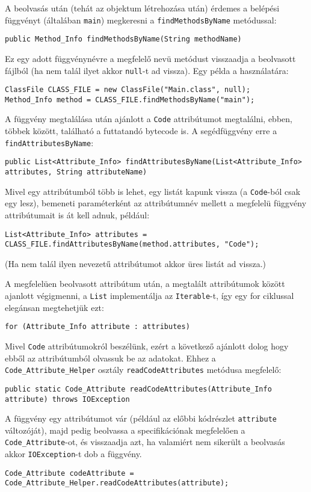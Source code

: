A beolvasás után (tehát az objektum létrehozása után) érdemes a belépési függvényt (általában \lstinline{main}) megkeresni a \lstinline{findMethodsByName} metódussal:
\begin{verbatim}
public Method_Info findMethodsByName(String methodName)
\end{verbatim}
Ez egy adott függvénynévre a megfelelő nevü metódust visszaadja a beolvasott fájlból (ha nem talál ilyet akkor \lstinline{null}-t ad vissza).
Egy példa a használatára:
\begin{verbatim}
ClassFile CLASS_FILE = new ClassFile("Main.class", null);
Method_Info method = CLASS_FILE.findMethodsByName("main");
\end{verbatim}

A függvény megtalálása után ajánlott a \lstinline{Code} attribútumot megtalálni, ebben, többek között, található a futtatandó bytecode is. A segédfüggvény erre a \lstinline{findAttributesByName}:
\begin{verbatim}
public List<Attribute_Info> findAttributesByName(List<Attribute_Info> attributes, String attributeName)
\end{verbatim}
Mivel egy attribútumból több is lehet, egy listát kapunk vissza (a \lstinline{Code}-ból csak egy lesz), bemeneti paraméterként az attribútumnév mellett a megfelelü függvény attribútumait is át kell adnuk, például:
\begin{verbatim}
List<Attribute_Info> attributes = CLASS_FILE.findAttributesByName(method.attributes, "Code");
\end{verbatim}
(Ha nem talál ilyen nevezetű attribútumot akkor üres listát ad vissza.)

A megfelelüen beolvasott attribútum után, a megtalált attribútumok között ajanlott végigmenni, a \lstinline{List} implementálja az \lstinline{Iterable}-t, így egy for ciklussal elegánsan megtehetjük ezt:
\begin{verbatim}
for (Attribute_Info attribute : attributes)
\end{verbatim}

Mivel \lstinline{Code} attribútumokról beszélünk, ezért a következő ajánlott dolog hogy ebből az attribútumból olvassuk be az adatokat. Ehhez a \lstinline{Code_Attribute_Helper} osztály \lstinline{readCodeAttributes} metódusa megfelelő:
\begin{verbatim}
public static Code_Attribute readCodeAttributes(Attribute_Info attribute) throws IOException
\end{verbatim}
A függvény egy attribútumot vár (például az előbbi kódrészlet \lstinline{attribute} változóját), majd pedig beolvassa a specifikációnak megfelelően a \lstinline{Code_Attribute}-ot, és visszaadja azt, ha valamiért nem sikerült a beolvasás akkor \lstinline{IOException}-t dob a függvény.
\begin{verbatim}
Code_Attribute codeAttribute = Code_Attribute_Helper.readCodeAttributes(attribute);
\end{verbatim}

